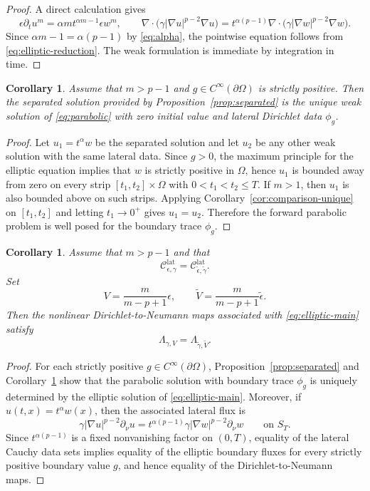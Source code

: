\documentclass[a4paper,12pt]{article}
\newcommand{\pr}{\partial}
\newtheorem{cor}[thm]{Corollary}
\theoremstyle{definition}
\theoremstyle{remark}
\begin{document}
\begin{proof}
A direct calculation gives
\[
\epsilon\pr_t u^m=\alpha m t^{\alpha m-1}\epsilon w^m,
\qquad
\nabla\cdot\bigl(\gamma|\nabla u|^{p-2}\nabla u\bigr)=t^{\alpha(p-1)}\nabla\cdot\bigl(\gamma|\nabla w|^{p-2}\nabla w\bigr).
\]
Since $\alpha m-1=\alpha(p-1)$ by \eqref{eq:alpha}, the pointwise equation follows from \eqref{eq:elliptic-reduction}. The weak formulation is immediate by integration in time.
\end{proof}

\begin{cor}\label{cor:separated-unique}
Assume that $m>p-1$ and $g\in C^\infty(\pr\Omega)$ is strictly positive. Then the separated solution provided by Proposition~\ref{prop:separated} is the unique weak solution of \eqref{eq:parabolic} with zero initial value and lateral Dirichlet data $\phi_g$.
\end{cor}

\begin{proof}
Let $u_1=t^\alpha w$ be the separated solution and let $u_2$ be any other weak solution with the same lateral data. Since $g>0$, the maximum principle for the elliptic equation implies that $w$ is strictly positive in $\Omega$, hence $u_1$ is bounded away from zero on every strip $[t_1,t_2]\times\Omega$ with $0<t_1<t_2\le T$. If $m>1$, then $u_1$ is also bounded above on such strips. Applying Corollary~\ref{cor:comparison-unique} on $[t_1,t_2]$ and letting $t_1\to0^+$ gives $u_1=u_2$. Therefore the forward parabolic problem is well posed for the boundary trace $\phi_g$.
\end{proof}

\begin{cor}\label{cor:parabolic-to-elliptic}
Assume that $m>p-1$ and that
\[
\mathcal C^{\mathrm{lat}}_{\epsilon,\gamma}=\mathcal C^{\mathrm{lat}}_{\tilde\epsilon,\tilde\gamma}.
\]
Set
\[
V=\frac{m}{m-p+1}\epsilon,
\qquad
\tilde V=\frac{m}{m-p+1}\tilde\epsilon.
\]
Then the nonlinear Dirichlet-to-Neumann maps associated with \eqref{eq:elliptic-main} satisfy
\[
\Lambda_{\gamma,V}=\Lambda_{\tilde\gamma,\tilde V}.
\]
\end{cor}

\begin{proof}
For each strictly positive $g\in C^\infty(\pr\Omega)$, Proposition~\ref{prop:separated} and Corollary~\ref{cor:separated-unique} show that the parabolic solution with boundary trace $\phi_g$ is uniquely determined by the elliptic solution of \eqref{eq:elliptic-main}. Moreover, if $u(t,x)=t^\alpha w(x)$, then the associated lateral flux is
\[
\gamma|\nabla u|^{p-2}\pr_\nu u=t^{\alpha(p-1)}\gamma|\nabla w|^{p-2}\pr_\nu w
\qquad\text{on }S_T.
\]
Since $t^{\alpha(p-1)}$ is a fixed nonvanishing factor on $(0,T)$, equality of the lateral Cauchy data sets implies equality of the elliptic boundary fluxes for every strictly positive boundary value $g$, and hence equality of the Dirichlet-to-Neumann maps.
\end{proof}
\end{document}
